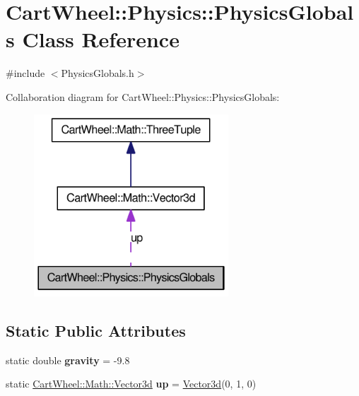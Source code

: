 \hypertarget{classCartWheel_1_1Physics_1_1PhysicsGlobals}{
\section{CartWheel::Physics::PhysicsGlobals Class Reference}
\label{classCartWheel_1_1Physics_1_1PhysicsGlobals}
}


{\ttfamily \#include $<$PhysicsGlobals.h$>$}



Collaboration diagram for CartWheel::Physics::PhysicsGlobals:\nopagebreak
\begin{figure}[H]
\begin{center}
\leavevmode
\includegraphics[width=206pt]{classCartWheel_1_1Physics_1_1PhysicsGlobals__coll__graph}
\end{center}
\end{figure}
\subsection*{Static Public Attributes}
\begin{DoxyCompactItemize}
\item 
\hypertarget{classCartWheel_1_1Physics_1_1PhysicsGlobals_a100e8bd36e6af83dfcfedf350fe43be1}{
static double {\bfseries gravity} = -\/9.8}
\label{classCartWheel_1_1Physics_1_1PhysicsGlobals_a100e8bd36e6af83dfcfedf350fe43be1}

\item 
\hypertarget{classCartWheel_1_1Physics_1_1PhysicsGlobals_a234e1911ad1ee21014469a6bd95d3b5e}{
static \hyperlink{classCartWheel_1_1Math_1_1Vector3d}{CartWheel::Math::Vector3d} {\bfseries up} = \hyperlink{classCartWheel_1_1Math_1_1Vector3d}{Vector3d}(0, 1, 0)}
\label{classCartWheel_1_1Physics_1_1PhysicsGlobals_a234e1911ad1ee21014469a6bd95d3b5e}

\end{DoxyCompactItemize}


